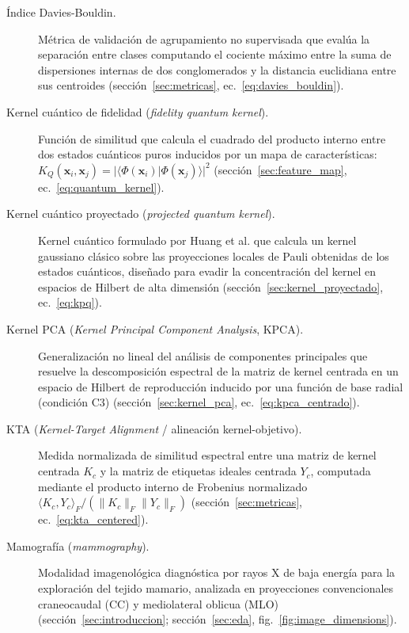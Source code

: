 \begin{description}
  \item[Índice Davies-Bouldin.] Métrica de validación de agrupamiento no supervisada que evalúa la separación entre clases computando el cociente máximo entre la suma de dispersiones internas de dos conglomerados y la distancia euclidiana entre sus centroides (sección~\ref{sec:metricas}, ec.~\ref{eq:davies_bouldin}).

  \item[Kernel cuántico de fidelidad (\textit{fidelity quantum kernel}).] Función de similitud que calcula el cuadrado del producto interno entre dos estados cuánticos puros inducidos por un mapa de características: $K_Q(\mathbf{x}_i, \mathbf{x}_j) = |\langle \Phi(\mathbf{x}_i)|\Phi(\mathbf{x}_j)\rangle|^2$ (sección~\ref{sec:feature_map}, ec.~\ref{eq:quantum_kernel}).

  \item[Kernel cuántico proyectado (\textit{projected quantum kernel}).] Kernel cuántico formulado por Huang et al. que calcula un kernel gaussiano clásico sobre las proyecciones locales de Pauli obtenidas de los estados cuánticos, diseñado para evadir la concentración del kernel en espacios de Hilbert de alta dimensión (sección~\ref{sec:kernel_proyectado}, ec.~\ref{eq:kpq}).

  \item[Kernel PCA (\textit{Kernel Principal Component Analysis}, KPCA).] Generalización no lineal del análisis de componentes principales que resuelve la descomposición espectral de la matriz de kernel centrada en un espacio de Hilbert de reproducción inducido por una función de base radial (condición C3) (sección~\ref{sec:kernel_pca}, ec.~\ref{eq:kpca_centrado}).

  \item[KTA (\textit{Kernel-Target Alignment} / alineación kernel-objetivo).] Medida normalizada de similitud espectral entre una matriz de kernel centrada $K_c$ y la matriz de etiquetas ideales centrada $Y_c$, computada mediante el producto interno de Frobenius normalizado $\langle K_c, Y_c \rangle_F / (\|K_c\|_F \|Y_c\|_F)$ (sección~\ref{sec:metricas}, ec.~\ref{eq:kta_centered}).

  \item[Mamografía (\textit{mammography}).] Modalidad imagenológica diagnóstica por rayos X de baja energía para la exploración del tejido mamario, analizada en proyecciones convencionales craneocaudal (CC) y mediolateral oblicua (MLO) (sección~\ref{sec:introduccion}; sección~\ref{sec:eda}, fig.~\ref{fig:image_dimensions}).


\end{description}
